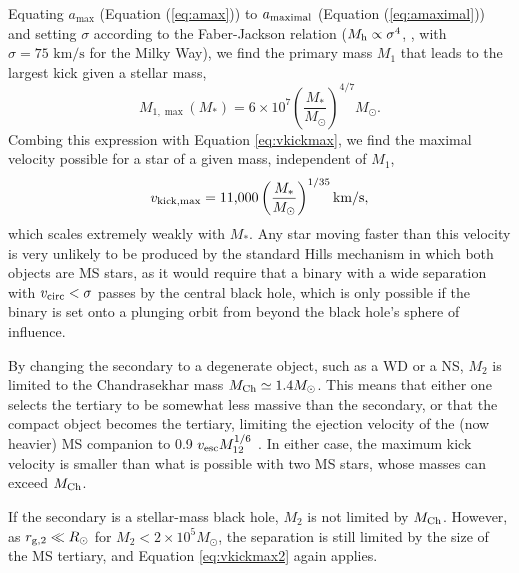 \documentclass[a4paper,twocolumn]{emulateapj}
\begin{document}
Equating $a_{\max}$ (Equation (\ref{eq:amax})) to $a_{\rm maximal}$ (Equation (\ref{eq:amaximal})) and setting $\sigma$ according to the Faber-Jackson relation ($M_{\rm h} \propto \sigma^{4}$, \citet{Kormendy:2013a}, with $\sigma = \textrm{75 km/s}$ for the Milky Way), we find the primary mass $M_{1}$ that leads to the largest kick given a stellar mass,
\begin{equation}
M_{1,\max} (M_{\ast}) = 6 \times 10^{7} \left(\frac{M_{\ast}}{M_{\odot}}\right)^{4/7} M_{\odot}.
\end{equation}
Combing this expression with Equation \ref{eq:vkickmax}, we find the maximal velocity possible for a star of a given mass, independent of $M_{1}$,
\begin{equation}
v_{\rm kick,\max} = \textrm{11,000} \left(\frac{M_{\ast}}{M_{\odot}}\right)^{1/35} \textrm{km/s}\label{eq:vkickmax2},
\end{equation}
which scales extremely weakly with $M_{\ast}$. Any star moving faster than this velocity is very unlikely to be produced by the standard Hills mechanism in which both objects are MS stars, as it would require that a binary with a wide separation with $v_{\rm circ} < \sigma$ passes by the central black hole, which is only possible if the binary is set onto a plunging orbit from beyond the black hole's sphere of influence.

By changing the secondary to a degenerate object, such as a WD or a NS, $M_{2}$ is limited to the Chandrasekhar mass $M_{\rm Ch} \simeq 1.4 M_{\odot}$. This means that either one selects the tertiary to be somewhat less massive than the secondary, or that the compact object becomes the tertiary, limiting the ejection velocity of the (now heavier) MS companion to 0.9 $v_{\rm esc} M_{12}^{1/6}$ \citep{Sari:2010a}. In either case, the maximum kick velocity is smaller than what is possible with two MS stars, whose masses can exceed $M_{\rm Ch}$.

If the secondary is a stellar-mass black hole, $M_{2}$ is not limited by $M_{\rm Ch}$. However, as $r_{\rm g,2} \ll R_{\odot}$ for $M_{2} < 2 \times 10^{5} M_{\odot}$, the separation is still limited by the size of the MS tertiary, and Equation \ref{eq:vkickmax2} again applies.
\end{document}
